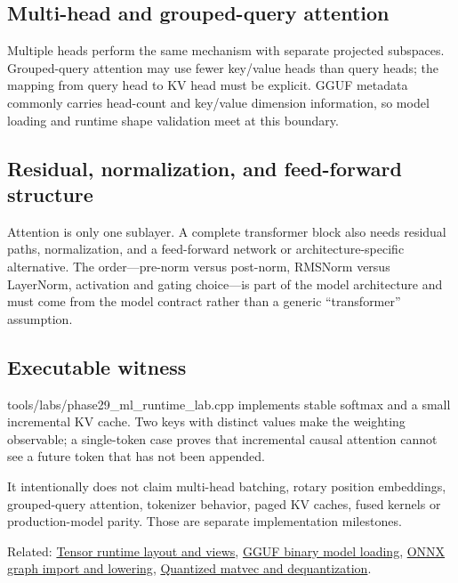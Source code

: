 \subsection{Multi-head and grouped-query attention}\label{multi-head-and-grouped-query-attention}

Multiple heads perform the same mechanism with separate projected subspaces. Grouped-query attention may use fewer key/value heads than query heads; the mapping from query head to KV head must be explicit. GGUF metadata commonly carries head-count and key/value dimension information, so model loading and runtime shape validation meet at this boundary.

\subsection{Residual, normalization, and feed-forward structure}\label{residual-normalization-and-feed-forward-structure}

Attention is only one sublayer. A complete transformer block also needs residual paths, normalization, and a feed-forward network or architecture-specific alternative. The order---pre-norm versus post-norm, RMSNorm versus LayerNorm, activation and gating choice---is part of the model architecture and must come from the model contract rather than a generic ``transformer'' assumption.

\subsection{Executable witness}\label{executable-witness}

tools/labs/phase29\_ml\_runtime\_lab.cpp implements stable softmax and a small incremental KV cache. Two keys with distinct values make the weighting observable; a single-token case proves that incremental causal attention cannot see a future token that has not been appended.

It intentionally does not claim multi-head batching, rotary position embeddings, grouped-query attention, tokenizer behavior, paged KV caches, fused kernels or production-model parity. Those are separate implementation milestones.

Related: \hyperref[appendix-cebadf3106d1]{Tensor runtime layout and views}, \hyperref[appendix-fef72dd246f2]{GGUF binary model loading}, \hyperref[appendix-a87217e3af2b]{ONNX graph import and lowering}, \hyperref[appendix-241c0e42ac2d]{Quantized matvec and dequantization}.
